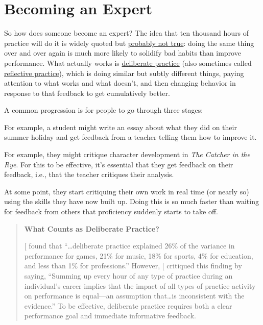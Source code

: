 \section{Becoming an Expert}\label{s:memory-becoming-expert}

So how does someone become an expert? The idea that ten thousand hours
of practice will do it is widely quoted but \href{http://www.goodlifeproject.com/podcast/anders-ericsson/}{probably not
true}: doing the same thing over and over again is
much more likely to solidify bad habits than improve performance. What
actually works is \protect\hyperlink{g:deliberate-practice}{deliberate practice} (also
sometimes called \protect\hyperlink{g:reflective-practice}{reflective practice}), which
is doing similar but subtly different things, paying attention to what
works and what doesn't, and then changing behavior in response to that
feedback to get cumulatively better.

A common progression is for people to go through three stages:

\begin{description}
\tightlist
\item[Act on feedback from others.]
For example, a student might write an essay about what they did on
their summer holiday and get feedback from a teacher telling them
how to improve it.
\item[Give feedback to others.]
For example, they might critique character development in \emph{The
Catcher in the Rye}. For this to be effective, it's essential that
they get feedback on their feedback, i.e., that the teacher critiques
their analysis.
\item[Give feedback to themselves.]
At some point, they start critiquing their own work in real time (or
nearly so) using the skills they have now built up. Doing this is so
much faster than waiting for feedback from others that proficiency
suddenly starts to take off.
\end{description}

\begin{quote}\setlength{\parindent}{0pt}
\textbf{What Counts as Deliberate Practice?}

{[}\protect[\hyperlink{b:Macn2014}{Macn2014}]{]} found that ``\ldots{}deliberate practice
explained 26\% of the variance in performance for games, 21\% for music,
18\% for sports, 4\% for education, and less than 1\% for professions.''
However, {[}\protect[\hyperlink{b:Eric2016}{Eric2016}]{]} critiqued this finding by saying, ``Summing
up every hour of any type of practice during an individual's career
implies that the impact of all types of practice activity on
performance is equal---an assumption that\ldots{}is inconsistent
with the evidence.'' To be effective, deliberate practice requires both
a clear performance goal and immediate informative feedback.
\end{quote}

